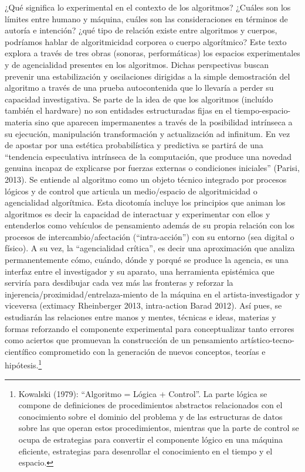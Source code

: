 ¿Qué significa lo experimental en el contexto de los algoritmos? ¿Cuáles son los límites entre humano y máquina, cuáles son las consideraciones en términos de autoría e intención? ¿qué tipo de relación existe entre algoritmos y cuerpos, podríamos hablar de algoritmicidad corporea o cuerpo algorítmico? Este texto explora a través de tres obras (sonoras, performáticas) los espacios experimentales y de agencialidad presentes en los algoritmos. Dichas perspectivas buscan prevenir una estabilización y oscilaciones dirigidas a la simple demostración del algoritmo a través de una prueba autocontenida que lo llevaría a perder su capacidad investigativa. Se parte de la idea de que los algoritmos (incluído también el hardware) no son entidades estructuradas fijas en el tiempo-espacio-materia sino que aparecen impermanentes a través de la posibilidad intrínseca a su ejecución, manipulación transformación y actualización ad infinitum. En vez de apostar por una estética probabilística y predictiva se partirá de una “tendencia especulativa intrínseca de la computación, que produce una novedad genuina incapaz de explicarse por fuerzas externas o condiciones iniciales” (Parisi, 2013). Se entiende al algoritmo como un objeto técnico integrado por procesos lógicos y de control que articula un medio/espacio de algoritmicidad o agencialidad algorítmica. Esta dicotomía incluye los principios que animan los algoritmos es decir la capacidad de interactuar y experimentar con ellos y entenderlos como vehículos de pensamiento además de su propia relación con los procesos de intercambio/afectación (“intra-acción”) con su entorno (sea digital o físico). A su vez, la “agencialidad crítica”, es decir una aproximación que analiza permanentemente cómo, cuándo, dónde y porqué se produce la agencia, es una interfaz entre el investigador y su aparato, una herramienta epistémica que serviría para desdibujar cada vez más las fronteras y reforzar la injerencia/proximidad/entrelaza-miento de la máquina en el artista-investigador y viceversa (extimacy Rheinberger 2013, intra-action Barad 2012). Así pues, se estudiarán las relaciones entre manos y mentes, técnicas e ideas, materias y formas reforzando el componente experimental para conceptualizar tanto errores como aciertos que promuevan la construcción de un pensamiento artístico-tecno-científico comprometido con la generación de nuevos conceptos, teorías e hipótesis.\footnote{Kowalski (1979): “Algoritmo = Lógica + Control”. La parte lógica se compone de definiciones de procedimientos abstractos relacionados con el conocimiento sobre el dominio del problema y de las estructuras de datos sobre las que operan estos procedimientos, mientras que la parte de control se ocupa de estrategias para convertir el componente lógico en una máquina eficiente, estrategias para desenrollar el conocimiento en el tiempo y el espacio.}

